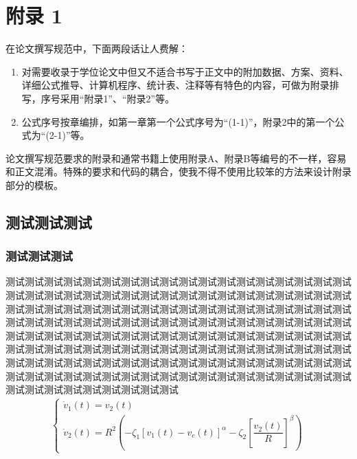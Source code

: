 \setcounter{chapter}{1} %
\setcounter{section}{0}
\setcounter{equation}{0}
\setcounter{table}{0}   
\setcounter{figure}{0}
\chapter{附\texorpdfstring{\quad}{}录 1} %

在论文撰写规范中，下面两段话让人费解：

\begin{enumerate}
	\item 	对需要收录于学位论文中但又不适合书写于正文中的附加数据、方案、资料、详细公式推导、计算机程序、统计表、注释等有特色的内容，可做为附录排写，序号采用“附录1”、“附录2”等。	
	\item	公式序号按章编排，如第一章第一个公式序号为“(1-1)”，附录2中的第一个公式为“(2-1)”等。
\end{enumerate}

论文撰写规范要求的附录和通常书籍上使用附录A、附录B等编号的不一样，容易和正文混淆。特殊的要求和代码的耦合，使我不得不使用比较笨的方法来设计附录部分的模板。

\section{测试测试测试}
\subsection{测试测试测试}
%
测试测试测试测试测试测试测试测试测试测试测试测试测试测试测试测试测试测试测试测试测试测试测试测试测试测试测试测试测试测试测试测试测试测试测试测试测试测试测试测试测试测试测试测试测试测试测试测试测试测试测试测试测试测试测试测试测试测试测试测试测试测试测试测试测试测试测试测试测试测试测试测试测试测试测试测试测试测试测试测试测试测试测试测试测试测试测试测试测试测试测试测试测试测试测试测试测试测试测试测试测试测试测试测试测试测试测试测试测试测试测试测试测试测试测试测试测试测试测试测试测试测试测试测试测试测试测试测试测试测试测试测试测试测试测试测试测试测试测试测试测试测试测试测试测试测试测试测试测试测试测试测试测试
\begin{align}
\left\{\begin{array}{l}
\dot{v}_{1}(t)=v_{2}(t) \\
\dot{v}_{2}(t)=R^{2}\left(-\zeta_{1}\left[v_{1}(t)-v_c(t)\right]^{\alpha}-\zeta_{2}\left[\dfrac{v_{2}(t)}{R}\right]^{\beta}\right)
\end{array}\right.	
\end{align}

